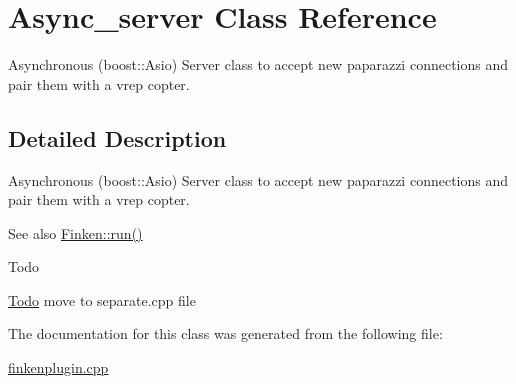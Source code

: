 \hypertarget{classAsync__server}{}\section{Async\+\_\+server Class Reference}
\label{classAsync__server}


Asynchronous (boost\+::\+Asio) Server class to accept new paparazzi connections and pair them with a vrep copter.  




\subsection{Detailed Description}
Asynchronous (boost\+::\+Asio) Server class to accept new paparazzi connections and pair them with a vrep copter. 

\begin{DoxySeeAlso}{See also}
\hyperlink{classFinken_ae3c3abbf571407e210f4b03b68cada9d}{Finken\+::run()} 
\end{DoxySeeAlso}
\begin{DoxyRefDesc}{Todo}
\item[\hyperlink{todo__todo000002}{Todo}]move to separate.\+cpp file \end{DoxyRefDesc}


The documentation for this class was generated from the following file\+:\begin{DoxyCompactItemize}
\item 
\hyperlink{finkenplugin_8cpp}{finkenplugin.\+cpp}\end{DoxyCompactItemize}
